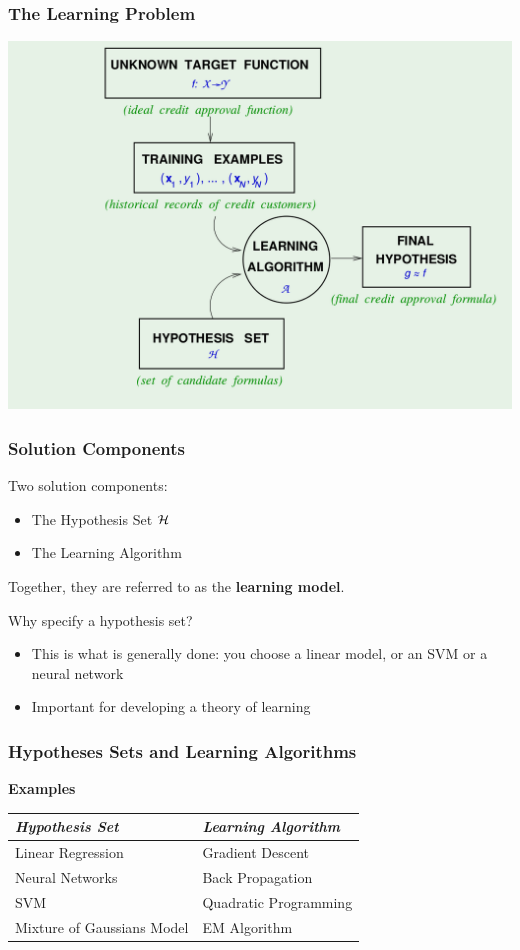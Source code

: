 \documentclass[xcolor=table]{beamer}
\begin{document}
\begin{frame}[t]
\frametitle{The Learning Problem}
\begin{center}
\includegraphics[scale=0.25]{the_learning_problem.png}
\end{center}
\end{frame}

\begin{frame}[t]
\frametitle{Solution Components}
Two solution components:
\begin{itemize}
    \item The Hypothesis Set $\cal{H}$
    \item The Learning Algorithm
\end{itemize}

Together, they are referred to as the \textbf{learning model}.

\pause

\bigskip

Why specify a hypothesis set?
\begin{itemize}
    \item This is what is generally done: you choose a linear model, 
    or an SVM or a neural network

    \item Important for developing a theory of learning 
\end{itemize}
\end{frame}

\begin{frame}[t]
\frametitle{Hypotheses Sets and Learning Algorithms}
\textbf{Examples}

\begin{center}
\begin{tabular}{ll}
\emph{Hypothesis Set} & \emph{Learning Algorithm} \\ \hline
Linear Regression & Gradient Descent \\
Neural Networks & Back Propagation \\
SVM & Quadratic Programming \\
Mixture of Gaussians Model & EM Algorithm \\
\end{tabular}
\end{center}
\end{frame}
\end{document}

